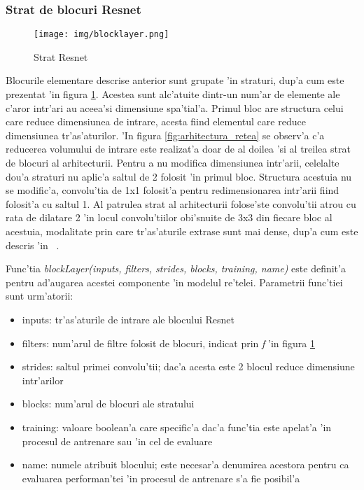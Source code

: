 \documentclass[12pt,a4paper,twoside]{report}
\begin{document}
\subsubsection{Strat de blocuri Resnet}

\begin{figure}[H]
  \texttt{[image: img/blocklayer.png]}
  \centering
  \caption{Strat Resnet}
  \label{fig:Layer_Resnet}
\end{figure}

Blocurile elementare descrise anterior sunt grupate 'in straturi, dup'a cum este prezentat 'in figura \ref{fig:Layer_Resnet}. Acestea sunt alc'atuite dintr-un num'ar de elemente ale c'aror intr'ari au aceea'si dimensiune spa'tial'a. Primul bloc are structura celui care reduce dimensiunea de intrare, acesta fiind elementul care reduce dimensiunea tr'as'aturilor. 'In figura \ref{fig:arhitectura_retea} se observ'a c'a reducerea volumului de intrare este realizat'a doar de al doilea 'si al treilea strat de blocuri al arhitecturii. Pentru a nu modifica dimensiunea intr'arii, celelalte dou'a straturi nu aplic'a saltul de 2 folosit 'in primul bloc. Structura acestuia nu se modific'a, convolu'tia de 1x1 folosit'a pentru redimensionarea intr'arii fiind folosit'a cu saltul 1. Al patrulea strat al arhitecturii folose'ste convolu'tii atrou cu rata de dilatare 2 'in locul convolu'tiilor obi'snuite de 3x3 din fiecare bloc al acestuia, modalitate prin care tr'as'aturile extrase sunt mai dense, dup'a cum este descris 'in ~\cite{DeepLabV3}.

Func'tia \textit{blockLayer(inputs, filters, strides, blocks, training, name)} este definit'a pentru ad'augarea acestei componente 'in modelul re'telei. Parametrii func'tiei sunt urm'atorii:
\begin{itemize}
\item inputs: tr'as'aturile de intrare ale blocului Resnet
\item filters: num'arul de filtre folosit de blocuri, indicat prin \textit{f} 'in figura \ref{fig:Layer_Resnet}
\item strides: saltul primei convolu'tii; dac'a acesta este 2 blocul reduce dimensiune intr'arilor
\item blocks: num'arul de blocuri ale stratului
\item training: valoare boolean'a care specific'a dac'a func'tia este apelat'a 'in procesul de antrenare sau 'in cel de evaluare
\item name: numele atribuit blocului; este necesar'a denumirea acestora pentru ca evaluarea performan'tei 'in procesul de antrenare s'a fie posibil'a
\end{itemize}
\end{document}
